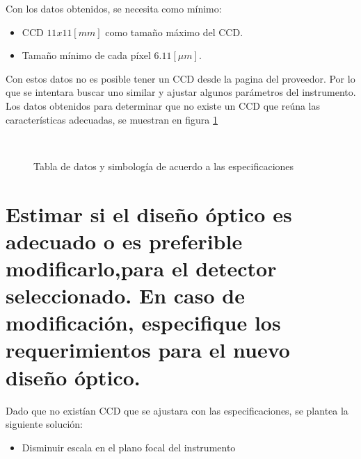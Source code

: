 \documentclass[a4paper,10pt]{article}
\begin{document}
Con los datos obtenidos, se necesita como mínimo:
\begin{itemize}
\item CCD $11x11[mm]$ como tamaño máximo del CCD.
\item Tamaño mínimo de cada píxel $6.11 [\mu m]$.
\end{itemize}

Con estos datos no es posible tener un CCD desde la pagina del proveedor. Por
lo que se intentara buscar uno similar y ajustar algunos parámetros del
instrumento.
Los datos obtenidos para determinar que no existe un CCD que reúna las características adecuadas, se muestran en figura \ref{fig:p1} 
\begin{figure}[ht!]
  \centering
  ~ 
  ~ 
  \caption{Tabla de datos y simbología de acuerdo a las especificaciones}
  \label{fig:p1}
\end{figure}



\section{Estimar si el diseño óptico es adecuado o es preferible
modificarlo,para el detector seleccionado. En caso de modificación, especifique
los requerimientos para el nuevo diseño óptico.} 

Dado que no existían CCD que se ajustara con las especificaciones, se plantea la
siguiente solución:
\begin{itemize}
\item Disminuir escala en el plano focal del instrumento
\end{itemize}
\end{document}
